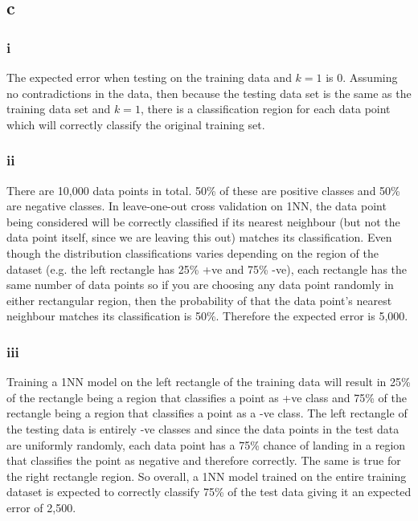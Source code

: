 \documentclass{article}
\begin{document}
\subsection*{c}

\subsubsection*{i}

The expected error when testing on the training data and \(k = 1\) is 0. Assuming no contradictions in the data, then because the testing data set is 
the same as the training data set and \(k = 1\), there is a classification region for each data point which will correctly classify the original training set.

\subsubsection*{ii}

There are 10,000 data points in total. 50\% of these are positive classes and 50\% are negative classes. In leave-one-out cross validation on 1NN, the data point being considered will be correctly classified if its nearest neighbour 
(but not the data point itself, since we are leaving this out) matches its classification. Even though the distribution classifications varies depending on 
the region of the dataset (e.g. the left rectangle has 25\% +ve and 75\% -ve), each rectangle has the same number of data points so if you are choosing any data point randomly in either rectangular region,
then the probability of that the data point's nearest neighbour matches its classification is 50\%. Therefore the expected error is 5,000.

\subsubsection*{iii}

Training a 1NN model on the left rectangle of the training data will result in 25\% of the rectangle being a region that classifies a point as +ve class and 
75\% of the rectangle being a region that classifies a point as a -ve class. The left rectangle of the testing data is entirely -ve classes and 
since the data points in the test data are uniformly randomly, each data point has a
75\% chance of landing in a region that classifies the point as negative and therefore correctly. The same is true for the right rectangle region.
So overall, a 1NN model trained on the entire training dataset is expected to correctly classify 75\% of the test data giving it an expected error 
of 2,500.
\end{document}
